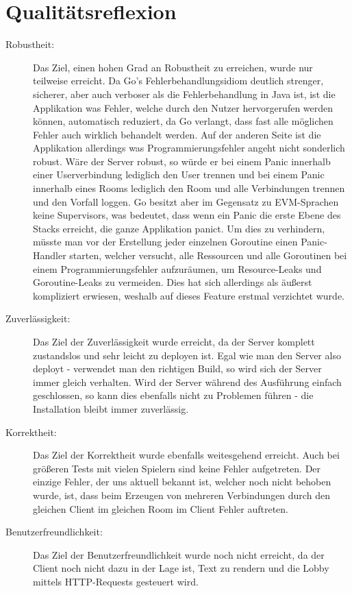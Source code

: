 \section{Qualitätsreflexion}
\begin{description}
	\item[Robustheit:] Das Ziel, einen hohen Grad an Robustheit zu erreichen, wurde nur teilweise erreicht. Da Go's Fehlerbehandlungsidiom deutlich strenger, sicherer, aber auch verboser als die Fehlerbehandlung in Java ist, ist die Applikation was Fehler, welche durch den Nutzer hervorgerufen werden können, automatisch reduziert, da Go verlangt, dass fast alle möglichen Fehler auch wirklich behandelt werden. Auf der anderen Seite ist die Applikation allerdings was Programmierungsfehler angeht nicht sonderlich robust. Wäre der Server robust, so würde er bei einem Panic innerhalb einer Userverbindung lediglich den User trennen und bei einem Panic innerhalb eines Rooms lediglich den Room und alle Verbindungen trennen und den Vorfall loggen. Go besitzt aber im Gegensatz zu EVM-Sprachen keine Supervisors, was bedeutet, dass wenn ein Panic die erste Ebene des Stacks erreicht, die ganze Applikation panict. Um dies zu verhindern, müsste man vor der Erstellung jeder einzelnen Goroutine einen Panic-Handler starten, welcher versucht, alle Ressourcen und alle Goroutinen bei einem Programmierungsfehler aufzuräumen, um Resource-Leaks und Goroutine-Leaks zu vermeiden. Dies hat sich allerdings als äußerst kompliziert erwiesen, weshalb auf dieses Feature erstmal verzichtet wurde.
	\item[Zuverlässigkeit:] Das Ziel der Zuverlässigkeit wurde erreicht, da der Server komplett zustandslos und sehr leicht zu deployen ist. Egal wie man den Server also deployt - verwendet man den richtigen Build, so wird sich der Server immer gleich verhalten. Wird der Server während des Ausführung einfach geschlossen, so kann dies ebenfalls nicht zu Problemen führen - die Installation bleibt immer zuverlässig.
	\item[Korrektheit:] Das Ziel der Korrektheit wurde ebenfalls weitesgehend erreicht. Auch bei größeren Tests mit vielen Spielern sind keine Fehler aufgetreten. Der einzige Fehler, der uns aktuell bekannt ist, welcher noch nicht behoben wurde, ist, dass beim Erzeugen von mehreren Verbindungen durch den gleichen Client im gleichen Room im Client Fehler auftreten.
	\item[Benutzerfreundlichkeit:] Das Ziel der Benutzerfreundlichkeit wurde noch nicht erreicht, da der Client noch nicht dazu in der Lage ist, Text zu rendern und die Lobby mittels HTTP-Requests gesteuert wird.

\end{description}
